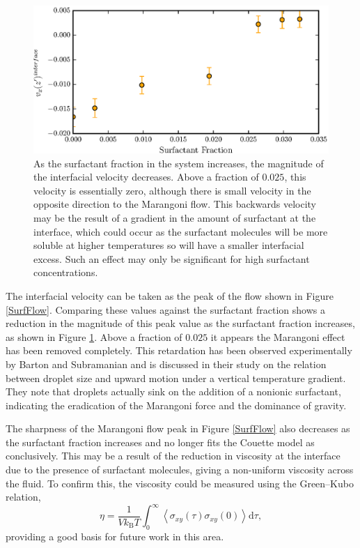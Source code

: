 \FloatBarrier
\begin{figure}[h]
\centering
\includegraphics[scale=0.8]{InterVel}
\caption{As the surfactant fraction in the system increases, the magnitude of the interfacial velocity decreases.
Above a fraction of $0.025$, this velocity is essentially zero, although there is small velocity in the opposite direction to the Marangoni flow.
This backwards velocity may be the result of a gradient in the amount of surfactant at the interface, which could occur as the surfactant molecules will be more soluble at higher temperatures so will have a smaller interfacial excess.
Such an effect may only be significant for high surfactant concentrations.
}
\label{InterVel}
\end{figure}
The interfacial velocity can be taken as the peak of the flow shown in Figure \ref{SurfFlow}.
Comparing these values against the surfactant fraction shows a reduction in the magnitude of this peak value as the surfactant fraction increases, as shown in Figure \ref{InterVel}.
Above a fraction of $0.025$ it appears the Marangoni effect has been removed completely.
This retardation has been observed experimentally by Barton and Subramanian and is discussed in their study on the relation between droplet size and upward motion under a vertical temperature gradient.\cite{BartonSubramanian} 
They note that droplets actually sink on the addition of a nonionic surfactant, indicating the eradication of the Marangoni force and the dominance of gravity.

\FloatBarrier
The sharpness of the Marangoni flow peak in Figure \ref{SurfFlow} also decreases as the surfactant fraction increases and no longer fits the Couette model as conclusively.
This may be a result of the reduction in viscosity at the interface due to the presence of surfactant molecules, giving a non-uniform viscosity across the fluid. 
To confirm this, the viscosity could be measured using the Green--Kubo relation,
\begin{equation}
\eta = \frac{1}{V k_{\mathrm{B}} T} \int_{0}^{\infty} \left< \sigma_{xy} \left( \tau \right) \sigma_{xy}(0) \right> \mathrm{d} \tau,
\end{equation}
providing a good basis for future work in this area.
